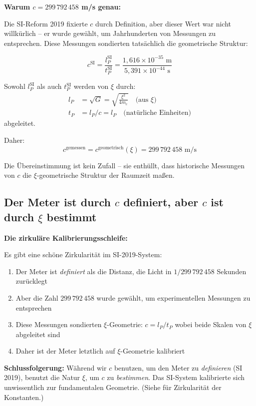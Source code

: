 	\begin{keyresult}
		\textbf{Warum $c = 299\,792\,458$ m/s genau:}
		
		Die SI-Reform 2019 fixierte $c$ durch Definition, aber dieser Wert war nicht willkürlich -- er wurde gewählt, um Jahrhunderten von Messungen zu entsprechen. Diese Messungen sondierten tatsächlich die geometrische Struktur:
		
		\begin{equation}
			c^{\text{SI}} = \frac{l_P^{\text{SI}}}{t_P^{\text{SI}}} = \frac{1{,}616 \times 10^{-35} \text{ m}}{5{,}391 \times 10^{-44} \text{ s}}
		\end{equation}
		
		Sowohl $l_P^{\text{SI}}$ als auch $t_P^{\text{SI}}$ werden von $\xi$ durch:
		\begin{align}
			l_P &= \sqrt{G} = \sqrt{\frac{\xi^2}{4m_e}} \quad \text{(aus } \xi\text{)} \\
			t_P &= l_P/c = l_P \quad \text{(natürliche Einheiten)}
		\end{align}
		abgeleitet.
		
		Daher:
		\begin{equation}
			\boxed{c^{\text{gemessen}} = c^{\text{geometrisch}}(\xi) = 299\,792\,458 \text{ m/s}}
		\end{equation}
		
		Die Übereinstimmung ist kein Zufall -- sie enthüllt, dass historische Messungen von $c$ die $\xi$-geometrische Struktur der Raumzeit maßen.
	\end{keyresult}
	
	\subsection{Der Meter ist durch $c$ definiert, aber $c$ ist durch $\xi$ bestimmt}
	
	\begin{insight}
		\textbf{Die zirkuläre Kalibrierungsschleife:}
		
		Es gibt eine schöne Zirkularität im SI-2019-System:
		
		\begin{enumerate}
			\item Der Meter ist \emph{definiert} als die Distanz, die Licht in $1/299\,792\,458$ Sekunden zurücklegt
			\item Aber die Zahl $299\,792\,458$ wurde gewählt, um experimentellen Messungen zu entsprechen
			\item Diese Messungen sondierten $\xi$-Geometrie: $c = l_P/t_P$ wobei beide Skalen von $\xi$ abgeleitet sind
			\item Daher ist der Meter letztlich auf $\xi$-Geometrie kalibriert
		\end{enumerate}
		
		\textbf{Schlussfolgerung:} Während wir $c$ benutzen, um den Meter zu \emph{definieren} (SI 2019), benutzt die Natur $\xi$, um $c$ zu \emph{bestimmen}. Das SI-System kalibrierte sich unwissentlich zur fundamentalen Geometrie. (Siehe \cite{zirkularitaet-Konstanten_De} für Zirkularität der Konstanten.)
	\end{insight}
	
